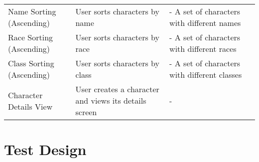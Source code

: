 \documentclass{article}
\begin{document}
\begin{table}[]
\begin{tabular}{|l|l|l|l}
Name Sorting (Ascending)   & User sorts characters by name                                            & - A set of characters with different names   &  \\ \cline{1-3}
Race Sorting (Ascending)   & User sorts characters by race                                            & - A set of characters with different races   &  \\ \cline{1-3}
Class Sorting (Ascending)  & User sorts characters by class                                           & - A set of characters with different classes &  \\ \cline{1-3}
Character Details View     & User creates a character and views its details screen                    & -                                            &  \\ \cline{1-3}
\end{tabular}
\end{table}

\newpage
\section{Test Design}
\end{document}

